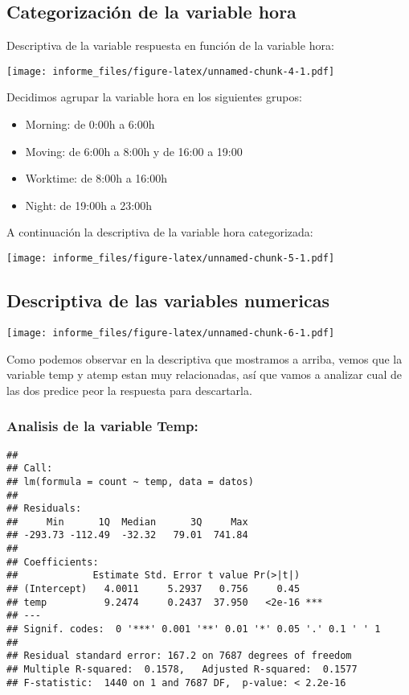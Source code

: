 \documentclass[
]{article}
\providecommand{\tightlist}{%
  \setlength{\itemsep}{0pt}\setlength{\parskip}{0pt}}
\begin{document}
\hypertarget{categorizaciuxf3n-de-la-variable-hora}{%
\subsection{Categorización de la variable
hora}\label{categorizaciuxf3n-de-la-variable-hora}}

Descriptiva de la variable respuesta en función de la variable hora:

\texttt{[image: informe\_files/figure-latex/unnamed-chunk-4-1.pdf]}

Decidimos agrupar la variable hora en los siguientes grupos:

\begin{itemize}
\tightlist
\item
  Morning: de 0:00h a 6:00h
\item
  Moving: de 6:00h a 8:00h y de 16:00 a 19:00
\item
  Worktime: de 8:00h a 16:00h
\item
  Night: de 19:00h a 23:00h
\end{itemize}

A continuación la descriptiva de la variable hora categorizada:

\texttt{[image: informe\_files/figure-latex/unnamed-chunk-5-1.pdf]}

\hypertarget{descriptiva-de-las-variables-numericas}{%
\subsection{Descriptiva de las variables
numericas}\label{descriptiva-de-las-variables-numericas}}

\texttt{[image: informe\_files/figure-latex/unnamed-chunk-6-1.pdf]}

Como podemos observar en la descriptiva que mostramos a arriba, vemos
que la variable temp y atemp estan muy relacionadas, así que vamos a
analizar cual de las dos predice peor la respuesta para descartarla.

\hypertarget{analisis-de-la-variable-temp}{%
\subsubsection{Analisis de la variable
Temp:}\label{analisis-de-la-variable-temp}}

\begin{verbatim}
## 
## Call:
## lm(formula = count ~ temp, data = datos)
## 
## Residuals:
##     Min      1Q  Median      3Q     Max 
## -293.73 -112.49  -32.32   79.01  741.84 
## 
## Coefficients:
##             Estimate Std. Error t value Pr(>|t|)    
## (Intercept)   4.0011     5.2937   0.756     0.45    
## temp          9.2474     0.2437  37.950   <2e-16 ***
## ---
## Signif. codes:  0 '***' 0.001 '**' 0.01 '*' 0.05 '.' 0.1 ' ' 1
## 
## Residual standard error: 167.2 on 7687 degrees of freedom
## Multiple R-squared:  0.1578,   Adjusted R-squared:  0.1577 
## F-statistic:  1440 on 1 and 7687 DF,  p-value: < 2.2e-16
\end{verbatim}
\end{document}
